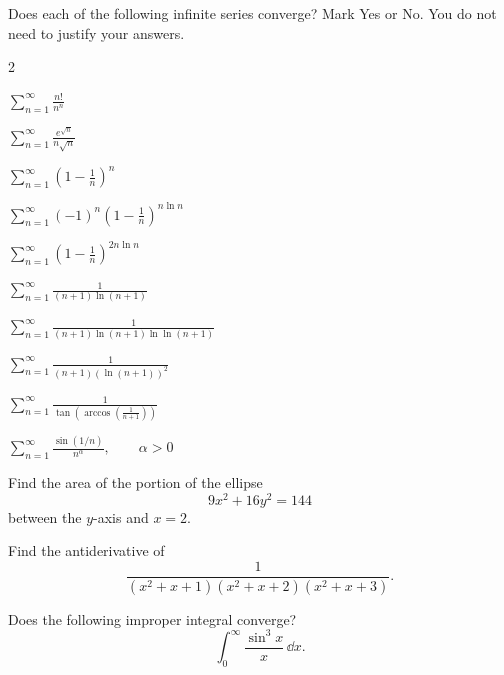 \begin{problem}
Does each of the following infinite series converge? Mark Yes or No. You do not need to justify your answers.
\begin{multicols}{2}
\begin{problemchoices}
\item $\displaystyle\sum_{n=1}^{\infty}\frac{n!}{n^n}$
\item $\displaystyle\sum_{n=1}^{\infty}\frac{e^{\sqrt n}}{n\sqrt n}$
\item $\displaystyle\sum_{n=1}^{\infty}\left(1-\frac1n\right)^n$
\item $\displaystyle\sum_{n=1}^{\infty}(-1)^n\left(1-\frac1n\right)^{n\ln n}$
\item $\displaystyle\sum_{n=1}^{\infty}\left(1-\frac1n\right)^{2n\ln n}$
\item $\displaystyle\sum_{n=1}^{\infty}\frac{1}{(n+1)\ln(n+1)}$
\item $\displaystyle\sum_{n=1}^{\infty}\frac{1}{(n+1)\ln(n+1)\ln\ln(n+1)}$
\item $\displaystyle\sum_{n=1}^{\infty}\frac{1}{(n+1)(\ln(n+1))^2}$
\item $\displaystyle\sum_{n=1}^{\infty}\frac{1}{\tan\!\left(\arccos\!\left(\frac{1}{n+1}\right)\right)}$
\item $\displaystyle\sum_{n=1}^{\infty}\frac{\sin(1/n)}{n^\alpha},\qquad \alpha>0$
\end{problemchoices}
\end{multicols}
\end{problem}

\begin{problem}
Find the area of the portion of the ellipse
\[
9x^2+16y^2=144
\]
between the $y$-axis and $x=2$.
\end{problem}

\begin{problem}
Find the antiderivative of
\[
\frac{1}{(x^2+x+1)(x^2+x+2)(x^2+x+3)}.
\]
\end{problem}

\begin{problem}
Does the following improper integral converge?
\[
\int_0^\infty \frac{\sin^3 x}{x}\,\dd x.
\]
\end{problem}


